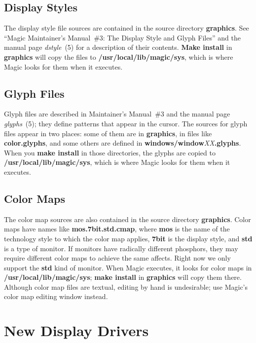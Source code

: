 \documentclass[letterpaper,twoside,12pt]{article}
\begin{document}
\subsection{Display Styles}

The display style file sources are contained in the source directory
{\bfseries graphics}.  See ``Magic Maintainer's Manual\ \#3:  The Display Style
and Glyph Files'' and the manual page {\itshape dstyle}~(5)
for a description of their contents.
{\bfseries Make install} in {\bfseries graphics} will copy the files to
{\bfseries /usr/local/lib/magic/sys}, which is where Magic looks
for them when it executes.

\subsection{Glyph Files}

Glyph files are described in Maintainer's Manual\ \#3 and the
manual page {\itshape glyphs}~(5);  they define patterns that
appear in the cursor.  The sources for glyph
files appear in two places:  some of them are in {\bfseries graphics},
in files like {\bfseries color.glyphs}, and some others are defined
in {\bfseries windows/window}{\itshape XX}{\bfseries .glyphs}.
When you {\bfseries make install} in
those directories, the glyphs are copied to
{\bfseries /usr/local/lib/magic/sys},%
which is where Magic looks for them when it executes.

\subsection{Color Maps}

The color map sources are also contained in the source directory {\bfseries graphics}.
Color maps have names like {\bfseries mos.7bit.std.cmap},
where {\bfseries mos} is the name of the technology style to which the color
map applies,
{\bfseries 7bit} is the display style,
and {\bfseries std} is a type of monitor.
If monitors
have radically different phosphors, they may require different
color maps to achieve the same affects.  Right now we only support
the {\bfseries std} kind of monitor.  When Magic executes, it looks for
color maps in {\bfseries /usr/local/lib/magic/sys};%
{\bfseries make install} in {\bfseries graphics}
will copy them there.  Although color map files are textual,
editing by hand is undesirable;  use Magic's color map editing
window instead.

\section{New Display Drivers}
\end{document}
